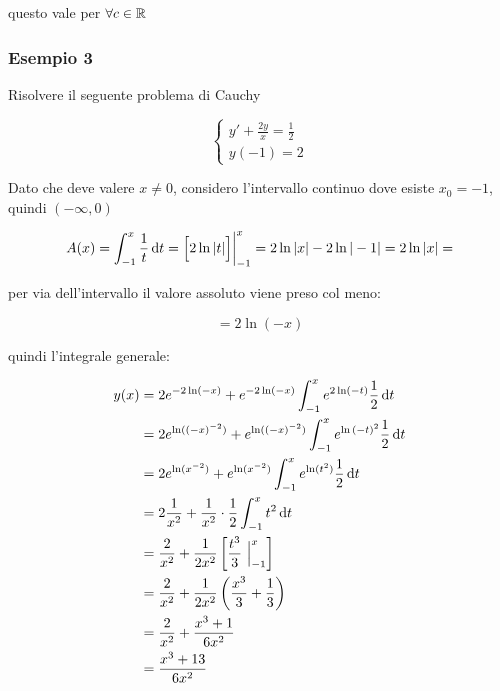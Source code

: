questo vale per \(\forall c \in \mathbb{R} \)

\pagebreak
\subsubsection*{Esempio 3}

Risolvere il seguente problema di Cauchy

\begin{equation*}
    \begin{cases}
        y' + \frac{2y}{x} = \frac{1}{2} \\
        y(-1)=2
    \end{cases}
\end{equation*}

Dato che deve valere \(x \ne 0\), considero l'intervallo continuo dove esiste \(x_0=-1\), quindi \((-\infty,0)\)

\[
    A(x) = \int_{{-1}}^{{x}} \frac{1}{t} \mathop{}\!\mathrm{d} t = {\Bigl[2 \ln{|t|}\Bigr]} \bigg|_{-1}^{x} = 2 \ln{|x|} - 2 \ln{|-1|} = 2 \ln{|x|} =
\]

per via dell'intervallo il valore assoluto viene preso col meno:

\[
    =2 \ln(-x)
\]

quindi l'integrale generale:
\begin{spreadlines}{2mm}
    \begin{align*}
        y(x) & = 2e^{-2\ln(-x)}+ e^{-2\ln(-x)} \int_{{-1}}^{{x}} e^{2\ln(-t)} \frac{1}{2} \mathop{}\!\mathrm{d} t                    \\
             & = 2e^{\ln({(-x)}^{-2})} + e^{\ln({(-x)}^{-2})} \int_{{-1}}^{{x}} e^{\ln {(-t)}^2} \frac{1}{2} \mathop{}\!\mathrm{d} t \\
             & = 2e^{\ln(x^{-2})} + e^{\ln(x^{-2})} \int_{{-1}}^{{x}} e^{\ln(t^2)} \frac{1}{2} \mathop{}\!\mathrm{d} t               \\
             & = 2\frac{1}{x^{2}} + \frac{1}{x^{2}} \cdot \frac{1}{2}\int_{{-1}}^{{x}} t^{2} \mathop{}\!\mathrm{d} t                 \\
             & = \frac{2}{x^{2}} + \frac{1}{2x^{2}} \left[ \frac{t^3}{3} ~\Big|_{-1}^{x} \right]                     \\
             & = \frac{2}{x^{2}} + \frac{1}{2x^{2}} \left(\frac{x^3}{3}+\frac{1}{3}\right)                           \\
             & = \frac{2}{x^{2}} + \frac{x^3 + 1}{6x^2}                                                              \\
             & = \frac{x^3 + 13}{6x^2}
    \end{align*}
\end{spreadlines}

